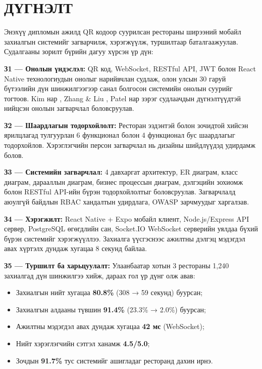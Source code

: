 \chapter*{ДҮГНЭЛТ}
\label{Conclusion}
\pagecolor{white}

Энэхүү дипломын ажилд QR кодоор суурилсан рестораны ширээний мобайл захиалгын
системийг загварчилж, хэрэгжүүлж, туршилтаар баталгаажуулав. Судалгааны зорилт
бүрийн дагуу хүрсэн үр дүн:

\textbf{З1 --- Онолын үндэслэл:} QR код, WebSocket, RESTful API, JWT болон
React Native технологиудын онолыг нарийвчлан судлаж, олон улсын 30 гаруй
бүтээлийн дүн шинжилгээгээр санал болгосон системийн онолын суурийг тогтоов.
Kim нар \cite{kim2023}, Zhang \& Liu \cite{zhang2022}, Patel нар \cite{patel2022}
зэрэг судлаачдын дүгнэлтүүдтэй нийцсэн онолын загварчлал боловсруулав.

\textbf{З2 --- Шаардлагын тодорхойлолт:} Ресторан эздэнтэй болон зочидтой
хийсэн ярилцлагад тулгуурлан 6 функционал болон 4 функционал бус шаардлагыг
тодорхойлов. Хэрэглэгчийн персон загварчлал нь дизайны шийдлүүдэд удирдамж болов.

\textbf{З3 --- Системийн загварчлал:} 4 давхаргат архитектур, ER диаграм, класс
диаграм, дарааллын диаграм, бизнес процессын диаграм, дэлгэцийн зохиомж болон
RESTful API-ийн бүрэн тодорхойлолтыг боловсруулав. Загварчлалд аюулгүй байдлын
RBAC хандалтын удирдлага, OWASP зарчмуудыг харгалзав.

\textbf{З4 --- Хэрэгжилт:} React Native + Expo мобайл клиент, Node.js/Express API
сервер, PostgreSQL өгөгдлийн сан, Socket.IO WebSocket серверийн уялдаа бүхий бүрэн
системийг хэрэгжүүллээ. Захиалга үүсгэснээс ажилтны дэлгэц мэдэгдэл авах хүртэлх
дундаж хугацаа 8 секунд байлаа.

\textbf{З5 --- Туршилт ба харьцуулалт:} Улаанбаатар хотын 3 рестораны 1,240
захиалгад дүн шинжилгээ хийж, дараах гол үр дүнг олж авав:

\begin{itemize}
    \item Захиалгын нийт хугацаа \textbf{80.8\%} (308 → 59 секунд) буурсан;
    \item Захиалгын алдааны түвшин \textbf{91.4\%} (23.3\% → 2.0\%) буурсан;
    \item Ажилтны мэдэгдэл авах дундаж хугацаа \textbf{42 мс} (WebSocket);
    \item Нийт хэрэглэгчийн сэтгэл ханамж \textbf{4.5/5.0};
    \item Зочдын \textbf{91.7\%} тус системийг ашигладаг ресторанд дахин ирнэ.
\end{itemize}

